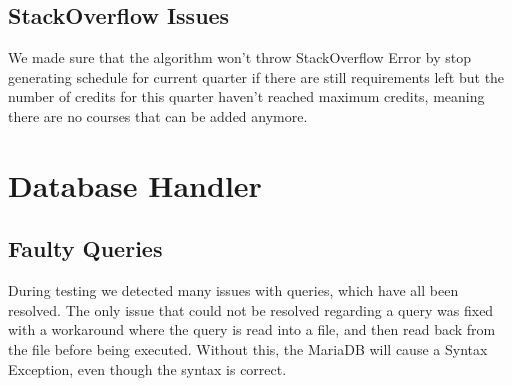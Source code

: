 \documentclass[letterpaper]{report}
\begin{document}
	\subsection{StackOverflow Issues}
	We made sure that the algorithm won't throw StackOverflow Error by stop generating schedule for current quarter if there are still requirements left but the number of credits for this quarter haven't reached maximum credits, meaning there are no courses that can be added anymore.
	
	\section{Database Handler}
	\subsection{Faulty Queries}
	During testing we detected many issues with queries, which have all been resolved. The only issue that could not be resolved regarding a query was fixed with a workaround where the query is read into a file, and then read back from the file before being executed. Without this, the MariaDB will cause a Syntax Exception, even though the syntax is correct. 
	
	
\end{document}

